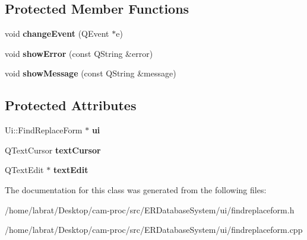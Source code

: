 \subsection*{Protected Member Functions}
\begin{DoxyCompactItemize}
\item 
void {\bfseries change\+Event} (Q\+Event $\ast$e)\hypertarget{classFindReplaceForm_a67f57e1f82d146cd0019cd64aa147e4b}{}\label{classFindReplaceForm_a67f57e1f82d146cd0019cd64aa147e4b}

\item 
void {\bfseries show\+Error} (const Q\+String \&error)\hypertarget{classFindReplaceForm_a49bcdfa2193f0fb5fa8ccbbf1875d893}{}\label{classFindReplaceForm_a49bcdfa2193f0fb5fa8ccbbf1875d893}

\item 
void {\bfseries show\+Message} (const Q\+String \&message)\hypertarget{classFindReplaceForm_a39929b108e4e85a9d64366777e9fde22}{}\label{classFindReplaceForm_a39929b108e4e85a9d64366777e9fde22}

\end{DoxyCompactItemize}
\subsection*{Protected Attributes}
\begin{DoxyCompactItemize}
\item 
Ui\+::\+Find\+Replace\+Form $\ast$ {\bfseries ui}\hypertarget{classFindReplaceForm_a9bf9e9096feff863dcd6c2a989e07d2c}{}\label{classFindReplaceForm_a9bf9e9096feff863dcd6c2a989e07d2c}

\item 
Q\+Text\+Cursor {\bfseries text\+Cursor}\hypertarget{classFindReplaceForm_acbbc970423e9e4dfcee99d53e02d8eb2}{}\label{classFindReplaceForm_acbbc970423e9e4dfcee99d53e02d8eb2}

\item 
Q\+Text\+Edit $\ast$ {\bfseries text\+Edit}\hypertarget{classFindReplaceForm_a6ddb6c32035bcafdd085c457c1ac125c}{}\label{classFindReplaceForm_a6ddb6c32035bcafdd085c457c1ac125c}

\end{DoxyCompactItemize}


The documentation for this class was generated from the following files\+:\begin{DoxyCompactItemize}
\item 
/home/labrat/\+Desktop/cam-\/proc/src/\+E\+R\+Database\+System/ui/findreplaceform.\+h\item 
/home/labrat/\+Desktop/cam-\/proc/src/\+E\+R\+Database\+System/ui/findreplaceform.\+cpp\end{DoxyCompactItemize}
